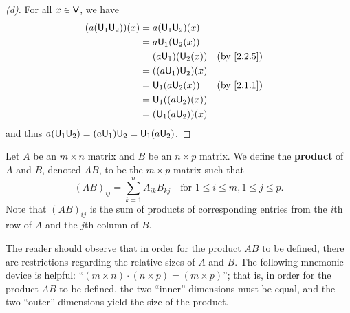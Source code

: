 \begin{proof}[(d)]
  For all \(x \in \mathsf{V}\), we have
  \begin{align*}
    (a (\U_1 \U_2))(x) & = a (\U_1 \U_2)(x)                                 \\
                       & = a \U_1(\U_2(x))                                  \\
                       & = (a \U_1)(\U_2(x))  &  & \text{(by \cref{2.2.5})} \\
                       & = ((a \U_1) \U_2)(x)                               \\
                       & = \U_1(a \U_2(x))    &  & \text{(by \cref{2.1.1})} \\
                       & = \U_1((a \U_2)(x))                                \\
                       & = (\U_1 (a \U_2))(x)
  \end{align*}
  and thus \(a (\mathsf{U}_1 \mathsf{U}_2) = (a \mathsf{U}_1) \mathsf{U}_2 = \mathsf{U}_1 (a \mathsf{U}_2)\).
\end{proof}

\begin{defn}\label{2.3.1}
  Let \(A\) be an \(m \times n\) matrix and \(B\) be an \(n \times p\) matrix.
  We define the \textbf{product} of \(A\) and \(B\), denoted \(AB\), to be the \(m \times p\) matrix such that
  \[
    (AB)_{i j} = \sum_{k = 1}^n A_{i k} B_{k j} \quad \text{for } 1 \leq i \leq m, 1 \leq j \leq p.
  \]
  Note that \((AB)_{i j}\) is the sum of products of corresponding entries from the \(i\)th row of \(A\) and the \(j\)th column of \(B\).
\end{defn}

\begin{note}
  The reader should observe that in order for the product \(AB\) to be defined, there are restrictions regarding the relative sizes of \(A\) and \(B\).
  The following mnemonic device is helpful:
  ``\((m \times n) \cdot (n \times p) = (m \times p)\)'';
  that is, in order for the product \(AB\) to be defined, the two ``inner'' dimensions must be equal, and the two ``outer'' dimensions yield the size of the product.
\end{note}

